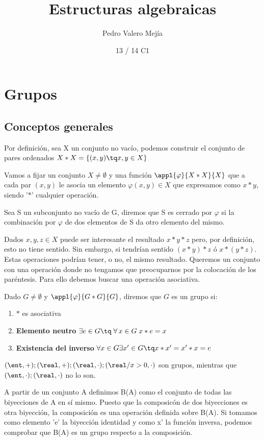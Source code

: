 \documentclass[nochap]{apuntes}
\title{Estructuras algebraicas}
\author{Pedro Valero Mejía}
\date{13 / 14 C1}
\begin{document}
\pagestyle{plain}
\maketitle
\tableofcontents
\newpage

\section{Grupos}
 
 \subsection{Conceptos generales}
 Por definición, sea X un conjunto no vacío, podemos construir el conjunto de pares ordenados $X\ast X=\{(x,y)\tq x,y\in X\}$
 
 Vamos a fijar un conjunto $X\neq \emptyset$  y una función $\appl{\varphi}{X\ast X}{X}$ que a cada par $(x,y)$ le 
 asocia un elemento $\varphi(x,y) \in X$ que expresamos como $x\ast y$, siendo '$\ast$' cualquier operación.
 
 \begin{defn}
  Sea S un subconjunto no vacío de G, diremos que S es cerrado por $\varphi$  si la combinación por $\varphi$  de dos elementos de
  S da otro elemento del mismo.
 \end{defn}
 
 Dados $x,y,z \in X$ puede ser interesante el resultado $x\ast y\ast z$ pero, por definición, esto no tiene sentido. Sin embargo, si tendrían 
 sentido $(x\ast y)\ast z$ ó $x\ast (y\ast z)$. Estas operaciones podrían tener, o no, el mismo resultado. Queremos un conjunto con una operación 
 donde no tengamos que preocuparnos por la colocación de los paréntesis. Para ello debemos buscar una operación asociativa.
 
 \begin{defn}[Grupo]
 Dado $G\neq \emptyset$  y $\appl{\varphi}{G\ast G}{G}$, diremos que $G$ es un grupo si:
 \begin{enumerate}
  \item $\ast$ es asociativa
  \item \textbf{Elemento neutro} $\exists  e \in G \tq \; \forall\, x\in G\; x\ast e=x$
  \item \textbf{Existencia del inverso} $\forall x \in G \exists x' \in G \tq x\ast x'=x'\ast x=e$
 \end{enumerate}
\end{defn}

 \begin{example}
   $ (\ent, +); (\real, +); (\real, \cdot); (\real/x>0, \cdot)$ son grupos, mientras que 
   $(\ent, \cdot); (\real, \cdot)$ no lo son.
   
   A partir de un conjunto A definimos B(A) como el conjunto de todas las biyecciones de A en sí mismo. Puesto que la composicón 
   de dos biyecciones es otra biyección, la composición es una operación definida sobre B(A). Si tomamos como elemento 'e' la biyección 
   identidad y como x' la función inversa, podemos comprobar que B(A) es un grupo respecto a la composición.
 \end{example}
  
\end{document}
